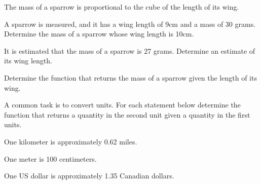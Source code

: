 \begin{problem}
\clearpage

\item The mass of a sparrow is proportional to the cube of the length of its wing.
  \begin{subproblem}
  \item \label{sparrowWingArea} A sparrow is measured, and it has a
    wing length of 9cm and a mass of 30 grams.  Determine the mass of
    a sparrow whose wing length is 10cm.  

    \vfill

  \item \label{sparrowMass} It is estimated that the mass of a sparrow
    is 27 grams. Determine an estimate of its wing length.  

    \vfill

  \item Determine the function that returns the mass of a sparrow
    given the length of its wing.

    \vfill
  \end{subproblem}

\clearpage

\item A common task is to convert units. For each statement below
  determine the function that returns a quantity in the second unit
  given a quantity in the first units.  
  \begin{subproblem}
    \item One kilometer is approximately 0.62 miles.
      \vfill
    \item One meter is 100 centimeters.
      \vfill
    \item One US dollar is approximately 1.35 Canadian dollars.
      \vfill
  \end{subproblem}


\end{problem}

\postClass


